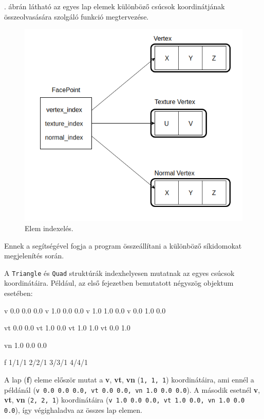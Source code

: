 . ábrán látható az egyes lap elemek különböző csúcsok koordinátjának összeolvasására szolgáló funkció megtervezése.

\begin{figure}[h]
\centering
\includegraphics[scale=0.5]{images/point.png}
\caption{Elem indexelés.}
\label{fig:index_}
\end{figure}

\noindent Ennek a segítségével fogja a program összeállítani a különböző síkidomokat megjelenítés során.

A \texttt{Triangle} és \texttt{Quad} struktúrák indexhelyesen mutatnak az egyes csúcsok koordinátáira.
Például, az első fejezetben bemutatott négyszög objektum esetében:
\begin{python} 
v 0.0 0.0 0.0
v 1.0 0.0 0.0
v 1.0 1.0 0.0
v 0.0 1.0 0.0

vt 0.0 0.0
vt 1.0 0.0
vt 1.0 1.0
vt 0.0 1.0

vn 1.0 0.0 0.0 

f 1/1/1 2/2/1 3/3/1 4/4/1
\end{python}
A lap (\textbf{f}) eleme először mutat a \textbf{v}, \textbf{vt}, \textbf{vn} (\texttt{1, 1, 1}) koordinátáira, ami ennél a példánál (\texttt{v 0.0 0.0 0.0, vt 0.0 0.0, vn 1.0 0.0 0.0}).
A második esetnél \textbf{v}, \textbf{vt}, \textbf{vn} (\texttt{2, 2, 1}) koordinátáira (\texttt{v 1.0 0.0 0.0, vt 1.0 0.0, vn 1.0 0.0 0.0}), így végighaladva az összes lap elemen.

